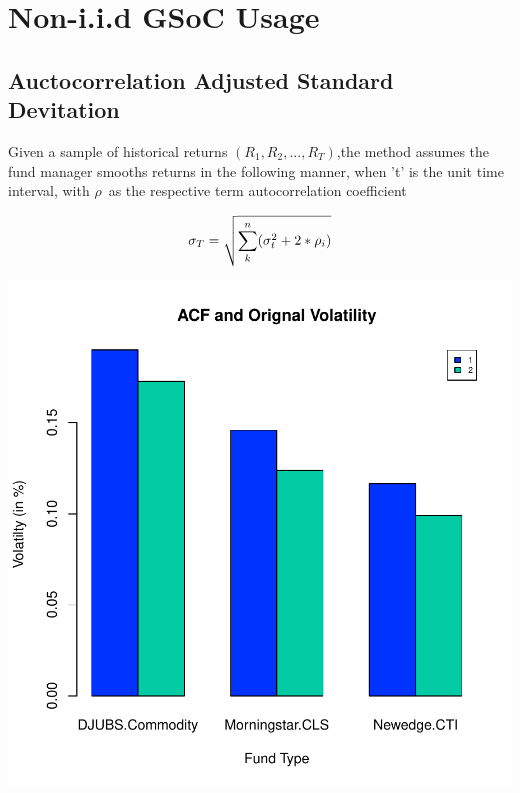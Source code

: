 \documentclass[12pt,letterpaper,english]{article}
\begin{document}
\section{Non-i.i.d GSoC Usage}
\subsection{Auctocorrelation Adjusted Standard Devitation}
Given a sample of historical returns \((R_1,R_2, . . .,R_T)\),the method assumes the fund manager smooths returns in the following manner, when 't' is the unit time interval, with  $\rho$\ as the respective term autocorrelation coefficient

  
\begin{equation}
 \sigma_{T}  =   \sqrt{  \sum_k^n(\sigma_{t}^2 +  2*\rho_i) } \\
\end{equation}


\includegraphics{CommodityReport-005}
\end{document}

